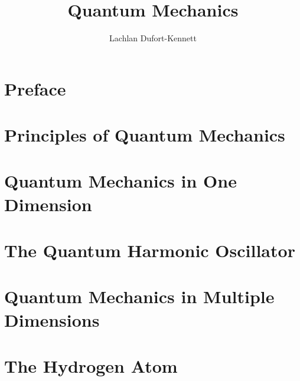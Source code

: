 \documentclass{lecture-notes}
\title{Quantum Mechanics}
\author{Lachlan Dufort-Kennett}
\begin{document}
    \frontmatter
    \maketitle
    \tableofcontents

    \chapter{Preface}\label{chap:preface}

    \mainmatter
    \chapter{Principles of Quantum Mechanics}\label{chap:principles}
    
    \chapter{Quantum Mechanics in One Dimension}\label{chap:one-dimension}
    
    \chapter{The Quantum Harmonic Oscillator}\label{chap:harmonic-oscillator}
    
    \chapter{Quantum Mechanics in Multiple Dimensions}\label{chap:multiple-dimensions}
    
    
    \chapter{The Hydrogen Atom}\label{chap:the-hydrogen-atom}
    

    \backmatter
    \nocite{*}
    
    \label{bibliography}
\end{document}
